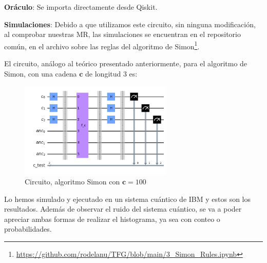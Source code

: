  \vspace{8pt}

 \textbf{Oráculo}: Se importa directamente desde Qiskit.\newline

 \textbf{Simulaciones}: Debido a que utilizamos este circuito, sin ninguna modificación, al comprobar nuestras MR, las simulaciones se encuentran en el repositorio común, en el archivo sobre las reglas del algoritmo de Simon\footnote{\url{https://github.com/rodelanu/TFG/blob/main/3_Simon_Rules.ipynb}}.

 \vspace{8pt}

 El circuito, análogo al teórico presentado anteriormente, para el algoritmo de Simon, con una cadena $\mathbf{c}$ de longitud 3 es:

 
 \begin{figure}[H]
    \centering
    \includegraphics[width=0.65\textwidth]{TFG/imagenes/simon1.png}
    \caption{Circuito, algoritmo Simon con $\mathbf{c}=100$}
    \label{Fig:CircuitoSimon1}
 \end{figure}

 Lo hemos simulado y ejecutado en un sistema cuántico de IBM y estos son los resultados. Además de observar el ruido del sistema cuántico, se va a poder apreciar ambas formas de realizar el histograma, ya sea con conteo o probabilidades.

